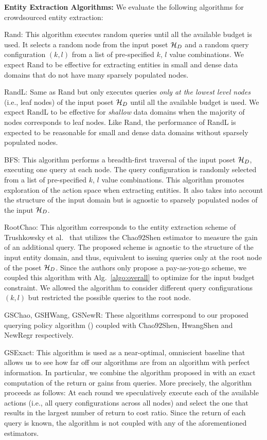 \vspace{2pt}\noindent\textbf{Entity Extraction Algorithms:} We evaluate the following algorithms for crowdsourced entity extraction:
\squishlist
\item Rand: This algorithm executes random queries until all the available budget is used. It selects a random node from the input poset $\mathcal{H}_D$ and a random query configuration $(k,l)$ from a list of pre-specified $k$, $l$ value combinations. \iftr We expect Rand to be effective for extracting entities in small and dense data domains that do not have many sparsely populated nodes. \fi
\item RandL: Same as Rand but only executes queries {\em only at the lowest level nodes} (i.e., leaf nodes) of the input poset $\mathcal{H}_D$ until all the available budget is used.  \iftr We expect RandL to be effective for {\em shallow} data domains when the majority of nodes corresponds to leaf nodes. Like Rand, the performance of RandL is expected to be reasonable for small and dense data domains without sparsely populated nodes.\fi
\item BFS: This algorithm performs a breadth-first traversal of the input poset $\mathcal{H}_D$, executing one query at each node. The query configuration is randomly selected from a list of pre-specified $k$, $l$ value combinations. This algorithm promotes exploration of the action space when extracting entities. \iftr It also takes into account the structure of the input domain but is agnostic to sparsely populated nodes of the input $\mathcal{H}_D$. \fi
\item RootChao: This algorithm corresponds to the entity extraction scheme of Trushkowsky et al.~\cite{trushkowsky:2013} that utilizes the Chao92Shen estimator to measure the gain of an additional query. The proposed scheme is agnostic to the structure of the input entity domain, and thus, equivalent to issuing queries only at the root node of the poset $\mathcal{H}_D$. Since the authors only propose a pay-as-you-go scheme, we coupled this algorithm with Alg.~\ref{algo:overall} to optimize for the input budget constraint. We allowed the algorithm to consider different query configurations $(k,l)$ but restricted the possible queries to the root node.
\item GSChao, GSHWang, GSNewR: These algorithms correspond to our proposed querying policy algorithm () coupled with Chao92Shen, HwangShen and NewRegr respectively.
\item GSExact: This algorithm is used as a near-optimal, omniscient baseline that allows us to see how far off our algorithms are from an algorithm with perfect information. In particular, we combine the algorithm proposed in  with an exact computation of the return or gains from queries. More precisely, the algorithm proceeds as follows: At each round we speculatively execute each of the available actions (i.e., all query configurations across all nodes) and select the one that results in the largest number of return to cost ratio. Since the return of each query is known, the algorithm is not coupled with any of the aforementioned estimators.
\squishend

